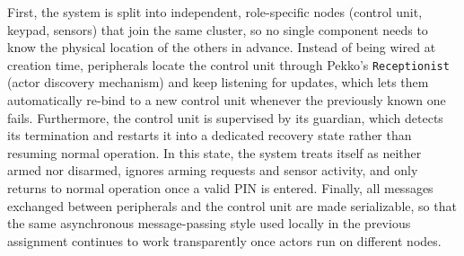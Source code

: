 \documentclass[11pt,a4paper]{article}
\begin{document}
First, the system is split into independent, role-specific nodes (control unit, keypad, sensors) that join the same cluster, so no single component needs to know the physical location of the others in advance. Instead of being wired at creation time, peripherals locate the control unit through Pekko's \texttt{Receptionist} (actor discovery mechanism) and keep listening for updates, which lets them automatically re-bind to a new control unit whenever the previously known one fails. Furthermore, the control unit is supervised by its guardian, which detects its termination and restarts it into a dedicated recovery state rather than resuming normal operation. In this state, the system treats itself as neither armed nor disarmed, ignores arming requests and sensor activity, and only returns to normal operation once a valid PIN is entered. Finally, all messages exchanged between peripherals and the control unit are made serializable, so that the same asynchronous message-passing style used locally in the previous assignment continues to work transparently once actors run on different nodes.
\end{document}
